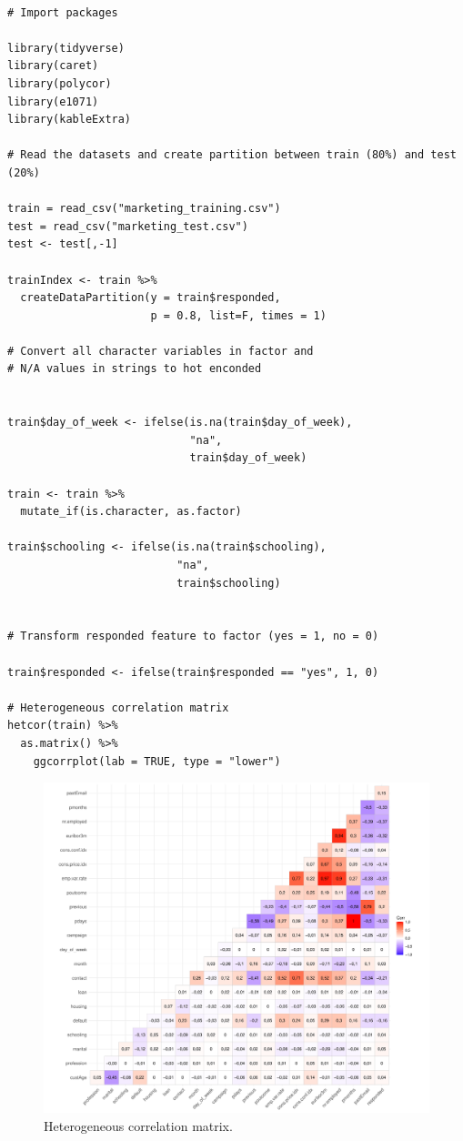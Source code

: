 \documentclass[12pt,]{article}
\begin{document}
\begin{lstlisting}[frame=single,framerule=0pt,framesep=8pt, basicstyle=\tiny]

# Import packages 

library(tidyverse)
library(caret)
library(polycor)
library(e1071)
library(kableExtra)

# Read the datasets and create partition between train (80%) and test (20%)

train = read_csv("marketing_training.csv")
test = read_csv("marketing_test.csv")
test <- test[,-1] 

trainIndex <- train %>% 
  createDataPartition(y = train$responded, 
                      p = 0.8, list=F, times = 1)

# Convert all character variables in factor and
# N/A values in strings to hot enconded 


train$day_of_week <- ifelse(is.na(train$day_of_week), 
                            "na", 
                            train$day_of_week)

train <- train %>% 
  mutate_if(is.character, as.factor)

train$schooling <- ifelse(is.na(train$schooling), 
                          "na", 
                          train$schooling)


# Transform responded feature to factor (yes = 1, no = 0)

train$responded <- ifelse(train$responded == "yes", 1, 0) 

# Heterogeneous correlation matrix
hetcor(train) %>% 
  as.matrix() %>% 
    ggcorrplot(lab = TRUE, type = "lower")

\end{lstlisting}

\begin{figure}[H]

{\centering \includegraphics{cs_challenge_files/figure-latex/fig1-1} 

}

\caption{Heterogeneous correlation matrix.}\label{fig:fig1}
\end{figure}
\end{document}

